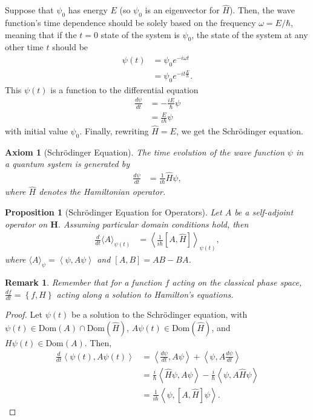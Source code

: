 \documentclass[10pt]{extarticle}
\newtheorem*{remark}{Remark}
\newcommand{\set}[1]{\left\{#1\right\}}
\newcommand{\iprod}[2]{\left\langle #1,#2\right\rangle}
\theoremstyle{plain}
\newtheorem*{axiom}{Axiom}%
\newtheorem*{proposition}{Proposition}%
\theoremstyle{definition}
\theoremstyle{remark}
\begin{document}
  Suppose that $\psi_0$ has energy $E$ (so $\psi_0$ is an eigenvector for $\hat{H}$). Then, the wave function's time dependence should be solely based on the frequency $\omega = E/\hbar$, meaning that if the $t=0$ state of the system is $\psi_0$, the state of the system at any other time $t$ should be
  \begin{align*}
    \psi(t) &= \psi_0 e^{-i\omega t}\\
            &= \psi_0 e^{-it\frac{E}{\hbar}}.
  \end{align*}
  This $\psi(t)$ is a function to the differential equation
  \begin{align*}
    \frac{d\psi}{dt} &= -\frac{iE}{\hbar}\psi\\
                     &= \frac{E}{i\hbar}\psi
  \end{align*}
  with initial value $\psi_0$. Finally, rewriting $\hat{H} = E$, we get the Schrödinger equation.
  \begin{axiom}[Schrödinger Equation]
    The time evolution of the wave function $\psi$ in a quantum system is generated by
    \begin{align*}
      \frac{d\psi}{dt} &= \frac{1}{i\hbar}\hat{H}\psi,
    \end{align*}
    where $\hat{H}$ denotes the Hamiltonian operator.
  \end{axiom}
  \begin{proposition}[Schrödinger Equation for Operators]
    Let $A$ be a self-adjoint operator on $\mathbf{H}$. Assuming particular domain conditions hold, then
    \begin{align*}
      \frac{d}{dt}\langle A\rangle_{\psi(t)} &= \left\langle \frac{1}{i\hbar}[A,\hat{H}]\right\rangle_{\psi(t)},
    \end{align*}
    where $\langle A \rangle_{\psi} = \iprod{\psi}{A\psi}$ and $[A,B] = AB-BA$.
  \end{proposition}
  \begin{remark}
    Remember that for a function $f$ acting on the classical phase space, $\frac{df}{dt} = \set{f,H}$ acting along a solution to Hamilton's equations.
  \end{remark}
  \begin{proof}
    Let $\psi(t)$ be a solution to the Schrödinger equation, with $\psi(t) \in \text{Dom}(A) \cap \text{Dom}(\hat{H})$, $A\psi(t) \in \text{Dom}(\hat{H})$, and $H\psi(t) \in \text{Dom}(A)$. Then,
    \begin{align*}
      \frac{d}{dt}\iprod{\psi(t)}{A\psi(t)} &= \iprod{\frac{d\psi}{dt}}{A\psi} + \iprod{\psi}{A\frac{d\psi}{dt}}\\
                                            &= \frac{i}{\hbar}\iprod{\hat{H}\psi}{A\psi} - \frac{i}{\hbar}\iprod{\psi}{A\hat{H}\psi}\\
                                            &= \frac{1}{i\hbar}\iprod{\psi}{[A,\hat{H}]\psi}.
    \end{align*}
  \end{proof}
\end{document}
